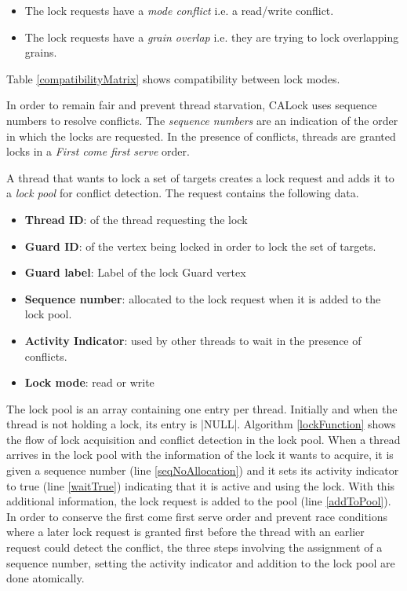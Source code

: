 \begin{itemize}
	\item The lock requests have a \emph{mode conflict} i.e. a read/write conflict. 
	\item The lock requests have a \emph{grain overlap} i.e. they are trying to lock overlapping grains.
\end{itemize}
Table \ref{compatibilityMatrix} shows compatibility between lock modes.

In order to remain fair and prevent thread starvation, CALock uses sequence numbers to resolve conflicts. The \emph{sequence numbers} are an indication of the order in which the locks are requested. In the presence of conflicts, threads are granted locks in a \emph{First come first serve} order.

A thread that wants to lock a set of targets creates a lock request and adds it to a \emph{lock pool} for conflict detection. 
The request contains the following data.


\begin{itemize}
	\item \textbf{Thread ID}: of the thread requesting the lock
	\item \textbf{Guard ID}: of the vertex being locked in order to lock the set of targets.
	\item \textbf{Guard label}: Label of the lock Guard vertex
	\item \textbf{Sequence number}: allocated to the lock request when it is added to the lock pool.
	\item \textbf{Activity Indicator}: used by other threads to wait in the presence of conflicts.
	\item \textbf{Lock mode}: read or write
\end{itemize}

The lock pool is an array containing one entry per thread. Initially and when the thread is not holding a lock, its entry is \inline|NULL|. 
Algorithm \ref{lockFunction} shows the flow of lock acquisition and conflict detection in the lock pool. 
When a thread arrives in the lock pool with the information of the lock it wants to acquire, it is given a sequence number (line \ref{seqNoAllocation}) and it sets its activity indicator to true (line \ref{waitTrue}) indicating that it is active and using the lock. 
With this additional information, the lock request is added to the pool (line \ref{addToPool}). 
In order to conserve the first come first serve order and prevent race conditions where a later lock request is granted first before the thread with an earlier request could detect the conflict, the three steps involving the assignment of a sequence number, setting the activity indicator and addition to the lock pool are done atomically.

